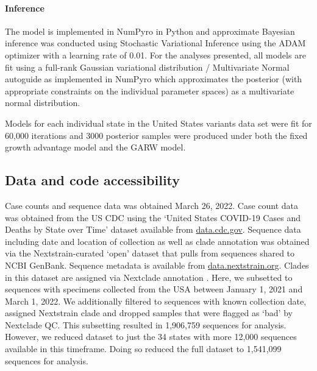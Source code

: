 \documentclass[11pt,oneside,letterpaper]{article}
\begin{document}
\paragraph{Inference}

The model is implemented in NumPyro \cite{phan2019composable} in Python and approximate Bayesian inference was conducted using Stochastic Variational Inference \cite{hoffman2013svi} using the ADAM optimizer \cite{kingma2017adam} with a learning rate of 0.01. For the analyses presented, all models are fit using a full-rank Gaussian variational distribution / Multivariate Normal autoguide as implemented in NumPyro \cite{phan2019composable} which approximates the posterior (with appropriate constraints on the individual parameter spaces) as a multivariate normal distribution.

Models for each individual state in the United States variants data set were fit for 60,000 iterations and 3000 posterior samples were produced under both the fixed growth advantage model and the GARW model.

\subsection*{Data and code accessibility}

Case counts and sequence data was obtained March 26, 2022.
Case count data was obtained from the US CDC using the `United States COVID-19 Cases and Deaths by State over Time' dataset available from \href{https://data.cdc.gov/Case-Surveillance/United-States-COVID-19-Cases-and-Deaths-by-State-o/9mfq-cb36}{data.cdc.gov}.
Sequence data including date and location of collection as well as clade annotation was obtained via the Nextstrain-curated `open' dataset \cite{Hadfield2018} that pulls from sequences shared to NCBI GenBank.
Sequence metadata is available from \href{https://docs.nextstrain.org/projects/ncov/en/latest/reference/remote_inputs.html}{data.nextstrain.org}.
Clades in this dataset are assigned via Nextclade annotation \cite{aksamentov2021nextclade}.
Here, we subsetted to sequences with specimens collected from the USA between January 1, 2021 and March 1, 2022.
We additionally filtered to sequences with known collection date, assigned Nextstrain clade and dropped samples that were flagged as `bad' by Nextclade QC.
This subsetting resulted in 1,906,759 sequences for analysis.
However, we reduced dataset to just the 34 states with more 12,000 sequences available in this timeframe.
Doing so reduced the full dataset to 1,541,099 sequences for analysis.
\end{document}
